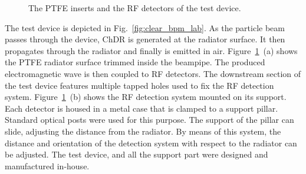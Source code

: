 \begin{figure}[!h]

\hspace{3mm}
\caption{The PTFE inserts and the RF detectors of the test device.}
\label{fig:bpm_details}

\end{figure}


The test device is depicted in Fig.~\ref{fig:clear_bpm_lab}. As the particle beam passes through the device, ChDR is generated at the radiator surface. It then propagates through the radiator and finally is emitted in air. Figure~\ref{fig:bpm_details}~(a) shows  the PTFE radiator surface trimmed inside the beampipe. The produced electromagnetic wave is then coupled to RF detectors. The downstream section of the test device features multiple tapped holes used to fix the RF detection system. Figure~\ref{fig:bpm_details}~(b) shows the RF detection system mounted on its support. Each detector is housed in a metal case that is clamped to a support pillar. Standard optical posts were used for this purpose. The support of the pillar can slide, adjusting the distance from the radiator. By means of this system, the distance and orientation of the detection system with respect to the radiator can be adjusted. The test device, and all the support part were designed and manufactured in-house.


